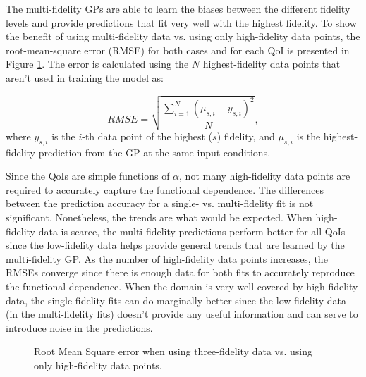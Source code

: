 The multi-fidelity GPs are able to learn the biases between the different fidelity levels and provide predictions that fit very well with the highest fidelity. To show the benefit of using multi-fidelity data vs. using only high-fidelity data points, the root-mean-square error (RMSE) for both cases and for each QoI is presented in Figure \ref{fig:mf_vs_hf}. The error is calculated using the $N$ highest-fidelity data points that aren't used in training the model as:

\begin{equation}\label{equ:rmse}
    RMSE = \sqrt{\frac{\sum_{i=1}^{N}\left ( \mu_{s,i} - y_{s,i} \right )^2}{N}},
\end{equation}
where $y_{s,i}$ is the $i$-th data point of the highest ($s$) fidelity, and $\mu_{s,i}$ is the highest-fidelity prediction from the GP at the same input conditions.  

Since the QoIs are simple functions of $\alpha$, not many high-fidelity data points are required to accurately capture the functional dependence. The differences between the prediction accuracy for a single- vs. multi-fidelity fit is not significant. Nonetheless, the trends are what would be expected. When high-fidelity data is scarce, the multi-fidelity predictions perform better for all QoIs since the low-fidelity data helps provide general trends that are learned by the multi-fidelity GP. As the number of high-fidelity data points increases, the RMSEs converge since there is enough data for both fits to accurately reproduce the functional dependence. When the domain is very well covered by high-fidelity data, the single-fidelity fits can do marginally better since the low-fidelity data (in the multi-fidelity fits) doesn't provide any useful information and can serve to introduce noise in the predictions.

\begin{figure}
    \centering
    \begin{subfigure}[RMSE for $C_L$ vs. $\alpha$.] {
        \texttt{[image: images/cl\_rsme\_comp.eps]} }
    \end{subfigure}
    \hfill
    \begin{subfigure}[RMSE for $C_D$ vs. $\alpha$.]{
        \texttt{[image: images/cd\_rsme\_comp.eps]} 
    }
    \end{subfigure}
    \hfill
    \begin{subfigure}[RMSE for $C_m$ vs. $\alpha$.]{
        \texttt{[image: images/cm\_rsme\_comp.eps]} 
    }
    \end{subfigure}
    \caption{Root Mean Square error when using three-fidelity data vs. using only high-fidelity data points.\label{fig:mf_vs_hf}}
\end{figure}

